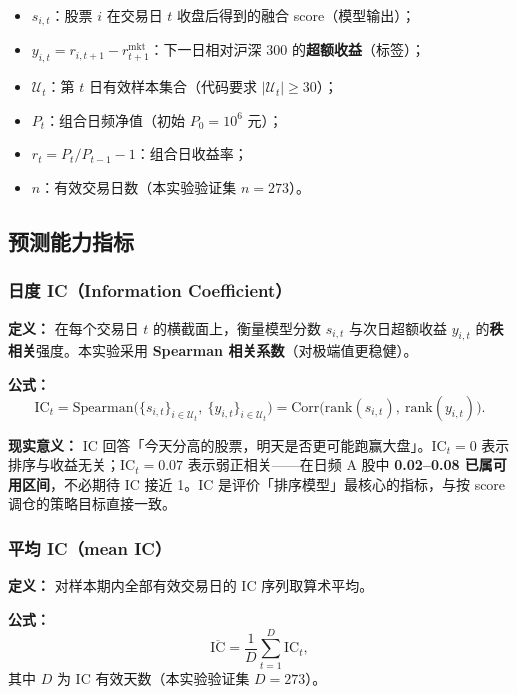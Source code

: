 \documentclass[UTF8,a4paper,12pt]{ctexart}
\begin{document}
\begin{itemize}[leftmargin=2em]
  \item $s_{i,t}$：股票 $i$ 在交易日 $t$ 收盘后得到的融合 score（模型输出）；
  \item $y_{i,t}=r_{i,t+1}-r^{\mathrm{mkt}}_{t+1}$：下一日相对沪深 300 的\textbf{超额收益}（标签）；
  \item $\mathcal U_t$：第 $t$ 日有效样本集合（代码要求 $|\mathcal U_t|\ge 30$）；
  \item $P_t$：组合日频净值（初始 $P_0=10^6$ 元）；
  \item $r_t = P_t/P_{t-1}-1$：组合日收益率；
  \item $n$：有效交易日数（本实验验证集 $n=273$）。
\end{itemize}

\subsection{预测能力指标}

\subsubsection{日度 IC（Information Coefficient）}

\textbf{定义：} 在每个交易日 $t$ 的横截面上，衡量模型分数 $s_{i,t}$ 与次日超额收益 $y_{i,t}$ 的\textbf{秩相关}强度。本实验采用 \textbf{Spearman 相关系数}（对极端值更稳健）。

\textbf{公式：}
\begin{equation}
  \mathrm{IC}_t
  = \mathrm{Spearman}\big(\{s_{i,t}\}_{i\in\mathcal U_t},\ \{y_{i,t}\}_{i\in\mathcal U_t}\big)
  = \mathrm{Corr}\big(\mathrm{rank}(s_{i,t}),\ \mathrm{rank}(y_{i,t})\big).
\end{equation}

\textbf{现实意义：} IC 回答「今天分高的股票，明天是否更可能跑赢大盘」。$\mathrm{IC}_t=0$ 表示排序与收益无关；$\mathrm{IC}_t=0.07$ 表示弱正相关——在日频 A 股中 \textbf{0.02--0.08 已属可用区间}，不必期待 IC 接近 1。IC 是评价「排序模型」最核心的指标，与按 score 调仓的策略目标直接一致。

\subsubsection{平均 IC（mean IC）}

\textbf{定义：} 对样本期内全部有效交易日的 IC 序列取算术平均。

\textbf{公式：}
\begin{equation}
  \overline{\mathrm{IC}} = \frac{1}{D}\sum_{t=1}^{D}\mathrm{IC}_t,
\end{equation}
其中 $D$ 为 IC 有效天数（本实验验证集 $D=273$）。
\end{document}
